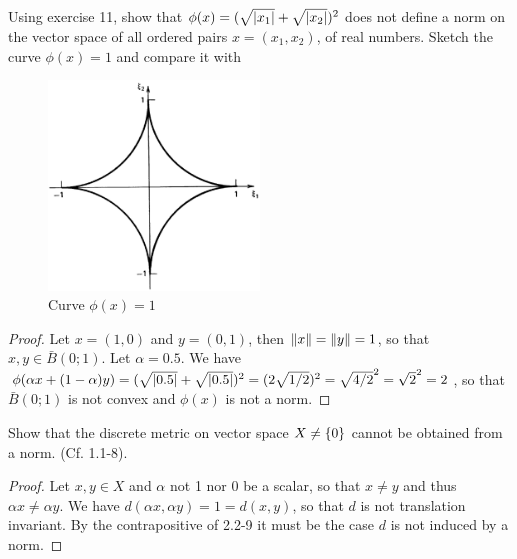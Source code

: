 \begin{exercise}{12}
Using exercise 11, show that $\phi(x)=(\sqrt{\left\lvert x_1\right\rvert}+\sqrt{\left\lvert x_2\right\rvert})^2$ does not define a norm on the vector space of all ordered pairs $x=(x_1,x_2)$, of real numbers. Sketch the curve $\phi(x)=1$ and compare it with 
\begin{figure}[H]
    \centering
    \includegraphics[width=0.5\textwidth]{kreyszig/assets/sec2-2-ex-12.png}
    \caption{Curve $\phi(x)=1$}
    \label{fig:sec2-2-ex12}
\end{figure}
\end{exercise}
\begin{proof}
Let $x=(1,0)$ and $y=(0,1)$, then $\left\lVert x\right\rVert=\left\lVert y\right\rVert=1$, so that $x,y\in\bar{B}(0;1)$. Let $\alpha=0.5$. We have $\phi(\alpha x+(1-\alpha)y) =(\sqrt{\left\lvert 0.5\right\rvert}+\sqrt{\left\lvert 0.5\right\rvert})^2 =(2\sqrt{1/2})^2 =\sqrt{4/2}^2 =\sqrt{2}^2 =2$, so that $\bar{B}(0;1)$ is not convex and $\phi(x)$ is not a norm.
\end{proof}

\begin{exercise}{13}
Show that the discrete metric on vector space $X\neq\{0\}$ cannot be obtained from a norm. (Cf. 1.1-8).
\end{exercise}
\begin{proof}
Let $x,y\in X$ and $\alpha$ not 1 nor 0 be a scalar, so that $x\neq y$ and thus $\alpha x\neq \alpha y$. We have $d(\alpha x,\alpha y)=1=d(x,y)$, so that $d$ is not translation invariant. By the contrapositive of 2.2-9 it must be the case $d$ is not induced by a norm.
\end{proof}

